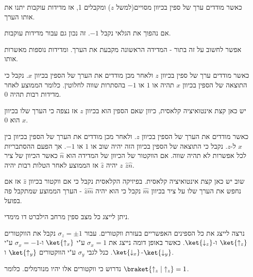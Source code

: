 \documentclass{tstextbook}
\begin{document}
\begin{proposition}
כאשר מודדים ערך של ספין בכיוון מסויים(למשל \(z\)) ומקבלים 1, אז מדידות עוקבות יתנו את אותו הערך.

\end{proposition}
\begin{proposition}
אם נהפוך את הגלאי נקבל \(-1\). זה נכון גם עבור מדידות עוקבות.

\end{proposition}
\begin{remark}
אפשר לחשוב על זה בתור - המדידה הראשונה מקבעת את הערך. ומדידות נוספות מאשרות אותו.

\end{remark}
\begin{proposition}
כאשר מודדים ערך של ספין בכיוון \(z\) ולאחר מכן מודדים את הערך של הספין בכיוון \(x\). נקבל כי התוצאה של הספין בכיוון \(x\) תהיה או \(1\) או \(-1\) בהסתרות שווה לחלוטין. כלומר הממוצע לאחר מדידות רבות תהיה 0.

\end{proposition}
\begin{remark}
יש כאן קצת אינטואיציה קלאסית, כיוון שאם הספין הוא בכיוון \(z\) אז נצפה כי הערך שלו בכיוון \(x\) הוא 0.

\end{remark}
\begin{proposition}
כאשר מודדים את הערך של הספין בכיוון \(z\). ולאחר מכן מודדים את הערך של הספין בכיוון בין \(x\) ל-\(z\). נקבל כי התוצאה של הספין בכיוון הזה יהיה שוב או \(1\) או \(-1\). אך הפעם ההסתבריות לכל אפשרות לא תהיה שווה. אם הווקטור של הכיוון של המדידה הוא \(\hat{n}\) כאשר הכיוון של ציר \(z\) יהיה \(\hat{z}\) אז הממוצע לאחר הטלות רבות יהיה \(\hat{z}\hat{n}\).

\end{proposition}
\begin{remark}
שוב יש כאן קצת אינטואיציה קלאסית. בפיזיקה הקלאסית נקבל כי אם ווקטור בכיוון \(\hat{z}\) אז אם נחפש את הערך שלו על ציר בכיוון \(\hat{m}\) נקבל כי הוא יהיה \(\hat{z}\hat{m}\) - הערך הממוצע שמתקבל פה בפועל.

\end{remark}
\begin{proposition}
ניתן לייצג כל מצב ספין מרחב הילברט דו מימדי.

\end{proposition}
\begin{symbolize}
נרצה לייצג את כל הספינים האפשריים בעזרת ווקטורים. עבור \(\sigma_{z}=\pm 1\) נקבל את הווקטורים \(\ket{\uparrow_{z}}\) ו-\(\ket{\downarrow_{z}}\).
כאשר באופן דומה נייצג את \(\sigma_{x}=1\) ע"י \(\ket{\uparrow_{x}}\) ו-\(\sigma_{x}=-1\) ע"י \(\ket{\downarrow_{x}}\). כנל לגבי \(\sigma_{y}\) ע"י הווקטורים \(\ket{\uparrow_{y}}\) ו-\(\ket{\downarrow_{y}}\).

\end{symbolize}
נדרוש כי ווקטורים אלו יהיו מנורמלים. כלומר \(\braket{ \uparrow_{z} | \uparrow_{z} }=1\).
\end{document}
